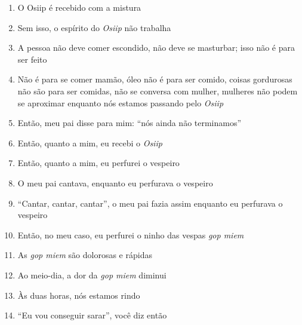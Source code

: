 \begin{enumerate}
 \item O Osiip é recebido com a mistura

 \item Sem isso, o espírito do \textit{Osiip} não trabalha

 \begin{center}\end{center}

 \item A pessoa não deve comer escondido, não deve se masturbar; isso não é
 para ser feito

 \item Não é para se comer mamão, óleo não é para ser comido, coisas
 gordurosas não são para ser comidas, não se conversa com mulher,
 mulheres não podem se aproximar enquanto nós estamos passando pelo
 \textit{Osiip}

 \begin{center}\end{center}

 \item Então, meu pai disse para mim: ``nós ainda não terminamos''

 \item Então, quanto a mim, eu recebi o \textit{Osiip}

 \item Então, quanto a mim, eu perfurei o vespeiro

 \item O meu pai cantava, enquanto eu perfurava o vespeiro

 \item ``Cantar, cantar, cantar'', o meu pai fazia assim enquanto eu perfurava o vespeiro

 \begin{center}\end{center}

 \item Então, no meu caso, eu perfurei o ninho das vespas \textit{gop miem}

 \item As \textit{gop miem} são dolorosas e rápidas

 \item Ao meio-dia, a dor da \textit{gop miem} diminui

 \item Às duas horas, nós estamos rindo

 \item ``Eu vou conseguir sarar'', você diz então


\end{enumerate}
